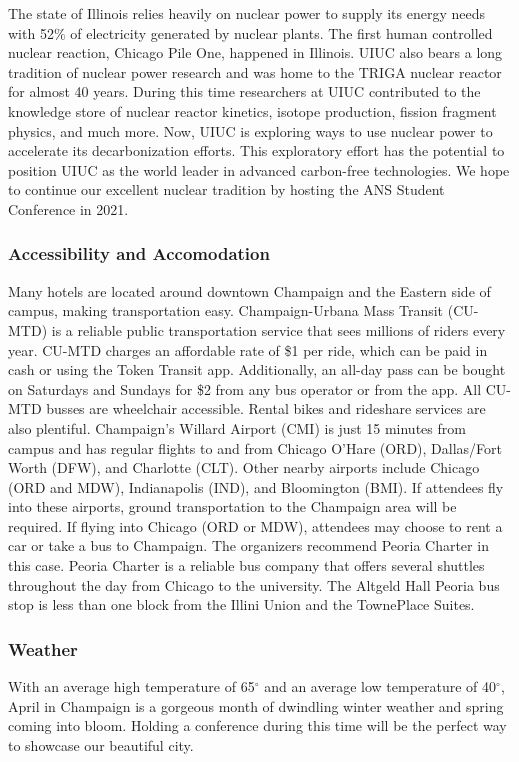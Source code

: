 The state of Illinois relies heavily on nuclear power to supply its energy needs with 52$\%$ of electricity generated by nuclear plants. The first human controlled nuclear reaction, Chicago Pile One, happened in Illinois. UIUC also bears a long tradition of nuclear power research and was home to the TRIGA nuclear reactor for almost 40 years. During this time researchers at UIUC contributed to the knowledge store of nuclear reactor kinetics, isotope production, fission fragment physics, and much more. Now, UIUC is exploring ways to use nuclear power to accelerate its decarbonization efforts. This exploratory effort has the potential to position UIUC as the world leader in advanced carbon-free technologies. We hope to continue our excellent nuclear tradition by hosting the ANS Student Conference in 2021. 
\clearpage

\subsubsection{Accessibility and Accomodation}
 Many hotels are located around downtown Champaign and the Eastern 
 side of campus, making transportation easy. Champaign-Urbana Mass Transit 
 (CU-MTD) is a reliable public transportation service that sees millions of 
 riders every year. CU-MTD charges an affordable rate of \$1 per ride, which 
 can be paid in cash or using the Token Transit app. Additionally, an all-day 
 pass can be bought on Saturdays and Sundays for \$2 from any bus operator or 
 from the app. All CU-MTD busses are wheelchair accessible. Rental bikes and 
 rideshare services are also plentiful.
 Champaign's Willard Airport (CMI) is just 15 minutes from campus and has 
regular flights to and from Chicago O’Hare (ORD), Dallas/Fort Worth (DFW), and 
Charlotte (CLT).  Other nearby airports include Chicago (ORD and MDW),
Indianapolis (IND), and Bloomington (BMI). If attendees fly into these
airports, ground transportation to the Champaign area will be required. 
If flying into Chicago (ORD or MDW), attendees may choose to rent a car or take a bus to 
Champaign. The organizers recommend Peoria Charter in this case. Peoria Charter 
is a reliable bus company that offers several shuttles throughout the day from 
Chicago to the university. The Altgeld Hall Peoria bus stop is less than one block 
from the Illini Union and the TownePlace Suites.
 

\subsubsection{Weather}
With an average high temperature of 65$^{\circ}$ and an average low temperature 
of 40$^{\circ}$, April in Champaign is a gorgeous month of dwindling winter 
weather and spring coming into bloom. Holding a conference during this time 
will be the perfect way to showcase our beautiful city.

